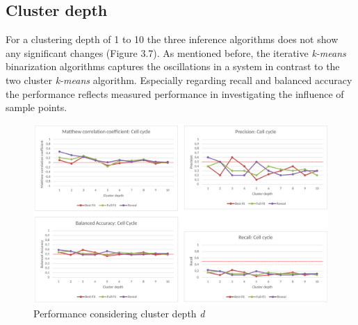 \subsection*{Cluster depth}
For a clustering depth of 1 to 10 the three inference algorithms does not show any significant changes (Figure 3.7). 
As mentioned before, the iterative \textit{k-means} binarization algorithms captures the oscillations in a system in contrast to the two cluster \textit{k-means} algorithm. %
Especially regarding recall and balanced accuracy the performance reflects measured performance in investigating the influence of sample points. 
\begin{figure}[H]
\captionsetup{width=1.0\linewidth}
\centering
\includegraphics[width=1.0\textwidth]{./Bilder/Scoring/insilico/3_cellcycle_clusterdepth/insilico3.pdf}
\caption[Performance considering cluster depth \textit{d}]{Performance considering cluster depth \textit{d}}
\label{fig:7}
\end{figure}

